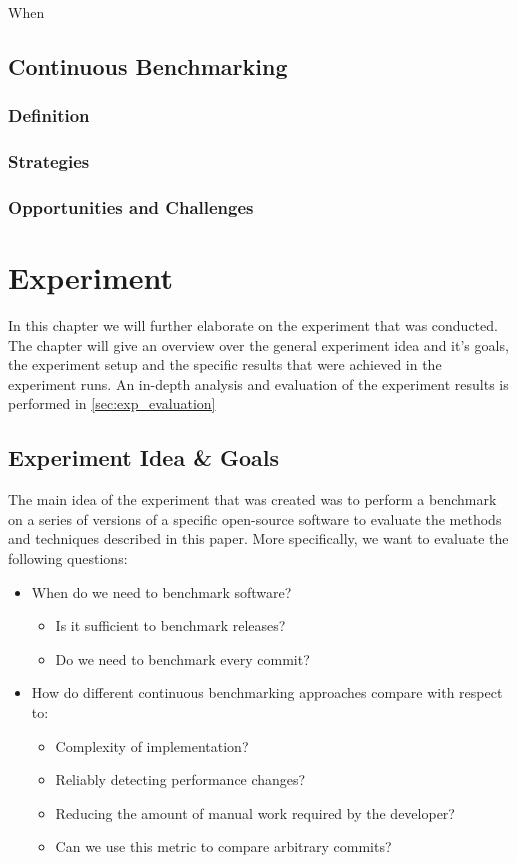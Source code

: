 \documentclass[	runningheads,
				a4paper]{llncs}
\begin{document}
	When 

	\subsection{Continuous Benchmarking}
		\subsubsection{Definition}
		\subsubsection{Strategies}
		\subsubsection{Opportunities and Challenges}


\section{Experiment}
In this chapter we will further elaborate on the experiment that was conducted. The chapter will give an overview over the general experiment idea and it's goals, the experiment setup and the specific results that were achieved in the experiment runs. An in-depth analysis and evaluation of the experiment results is performed in \autoref{sec:exp_evaluation}

	\subsection{Experiment Idea \& Goals}
	\label{ssec:exp_goals}

	The main idea of the experiment that was created was to perform a benchmark on a series of versions of a specific open-source software to evaluate the methods and techniques described in this paper. More specifically, we want to evaluate the following questions:
	\begin{itemize}
		\item When do we need to benchmark software?
			\begin{itemize}
				\item Is it sufficient to benchmark releases?
				\item Do we need to benchmark every commit?
			\end{itemize}
		\item How do different continuous benchmarking approaches compare with respect to:
			\begin{itemize}
				\item Complexity of implementation?
				\item Reliably detecting performance changes?
				\item Reducing the amount of manual work required by the developer?
				\item Can we use this metric to compare arbitrary commits?
			\end{itemize}
	\end{itemize}
\end{document}
